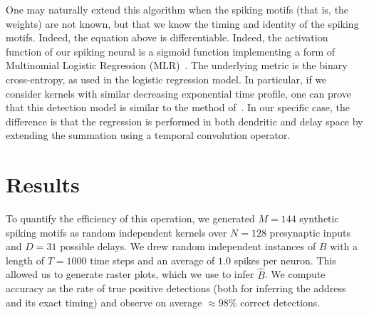 \documentclass[runningheads]{llncs}
\newcommand{\presynaddr}{a} %
\newcommand{\postsynaddr}{b} %
\newcommand{\arank}{r} %
\newcommand{\bias}{b} %
\newcommand{\synapse}{\mathcal{S}} %
\newcommand{\activeweights}{\mathcal{W}}
\newcommand{\timev}{t} %
\newcommand{\Nclass}{N_\text{class}} %
\newcommand{\Nspeed}{N_v}
\begin{document}
One may naturally extend this algorithm when the spiking motifs (that is, the weights) are not known, but that we know the timing and identity of the spiking motifs. Indeed, the equation above is differentiable. Indeed, the activation function of our spiking neural is a sigmoid function implementing a form of  Multinomial Logistic Regression (MLR)~\cite{grimaldi_learning_2023}.  
The underlying metric is the binary cross-entropy, as used in the logistic regression model. In particular, if we consider kernels with similar decreasing exponential time profile, one can prove that this detection model is similar to the method of~\cite{berens_fast_2012}. In our specific case, the difference is that the regression is performed in both dendritic and delay space by extending the summation using a temporal convolution operator. 

%
%
%
\section{Results}
%
To quantify the efficiency of this operation, we generated $M=144$ synthetic spiking motifs as random independent kernels over $N=128$ presynaptic inputs and $D=31$ possible delays. We drew random independent instances of $B$ with a length of $T=1000$ time steps and an average of $1.0$ spikes per neuron. This allowed us to generate raster plots, which we use to infer $\hat{B}$. We compute accuracy as the rate of true positive detections (both for inferring the address and its exact timing) and observe on average $\approx 98\%$ correct detections.
\end{document}

